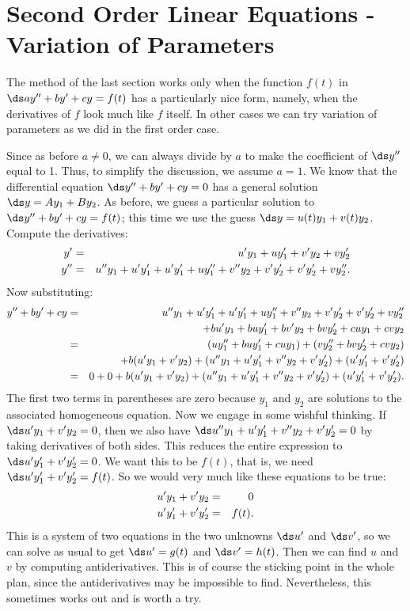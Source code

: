 \section{Second Order Linear Equations - Variation of Parameters}{}{}\label{sec:2nd order differential equations two} 
The method of the last section works only when the function $f(t)$ in
$\ds ay''+by'+cy=f(t)$ has a particularly nice form, namely,
when the derivatives of $f$ look much like $f$ itself. In other cases
we can try variation of parameters as we did in the first order case.

Since as before
$a\not=0$, we can always divide by $a$ to make the coefficient of
$\ds y''$ equal to 1. Thus, to simplify the discussion, we assume $a=1$. 
We know that the differential equation $\ds y''+by'+cy=0$
has a general solution $\ds y=Ay_1+By_2$. As before, we guess a
particular solution to $\ds y''+by'+cy=f(t)$; this time we use
the guess $\ds y=u(t)y_1+v(t)y_2$. Compute the derivatives:
\begin{eqnarray*}
y'&=&u'y_1+uy'_1+v'y_2+vy'_2\cr
y''&=&u''y_1+u'y'_1+u'y'_1+uy''_1+v''y_2+v'y'_2+v'y'_2+vy''_2.
\end{eqnarray*}
Now substituting:
\begin{eqnarray*}
y''+by'+cy&=&
u''y_1+u'y'_1+u'y'_1+uy''_1+v''y_2+v'y'_2+v'y'_2+vy''_2\cr
&&\qquad + bu'y_1+buy'_1+bv'y_2+bvy'_2+cuy_1+cvy_2\cr
&=&(uy''_1+buy'_1+cuy_1)+(vy''_2+bvy'_2+cvy_2)\cr
&&\qquad + b(u'y_1+v'y_2) + (u''y_1+u'y'_1+v''y_2+v'y'_2)+
(u'y'_1+v'y'_2)\cr
&=&0+0+ b(u'y_1+v'y_2) + (u''y_1+u'y'_1+v''y_2+v'y'_2)+
(u'y'_1+v'y'_2).
\end{eqnarray*}
The first two terms in parentheses are zero because $y_1$ and $y_2$
are solutions to the associated homogeneous equation. Now we engage in
some wishful thinking. If $\ds u'y_1+v'y_2=0$, then we also have
$\ds u''y_1+u'y'_1+v''y_2+v'y'_2=0$ by taking derivatives of both sides. This reduces the
entire expression to $\ds u'y'_1+v'y'_2=0$. We want this
to be $f(t)$, that is, we need 
$\ds u'y'_1+v'y'_2=f(t)$.
So we would very much like these equations to be true:
\begin{eqnarray*}
u'y_1+v'y_2&=&0\cr
u'y'_1+v'y'_2&=&f(t).
\end{eqnarray*}
This is a system of two equations in the two unknowns $\ds u'$ and
$\ds v'$, so we can solve as usual to get $\ds u'=g(t)$ and
$\ds v'=h(t)$. Then we can find $u$ and $v$ by computing
antiderivatives. This is of course the sticking point in the whole
plan, since the antiderivatives may be impossible to
find. Nevertheless, this sometimes works out and is worth a try.

